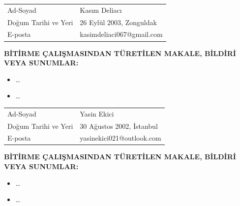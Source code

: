 \documentclass{btu-thesis}
\begin{document}
\BTUmainmatter





\printbibliography[heading=btureferences]

% 

\begin{BTUcv}
\begin{tabular}{@{}p{4.3cm}@{ : }p{9cm}@{}}
Ad-Soyad & Kasım Deliacı\\
Doğum Tarihi ve Yeri & 26 Eylül 2003, Zonguldak\\
E-posta & kasimdeliaci067@gmail.com\\
\end{tabular}

\vspace{1cm}
\textbf{BİTİRME ÇALIŞMASINDAN TÜRETİLEN MAKALE, BİLDİRİ VEYA SUNUMLAR:}

\begin{itemize}
\item \ldots
\item \ldots
\end{itemize}

\clearpage

\begin{tabular}{@{}p{4.3cm}@{ : }p{9cm}@{}}
Ad-Soyad & Yasin Ekici\\
Doğum Tarihi ve Yeri & 30 Ağustos 2002, İstanbul\\
E-posta & yasinekici021@outlook.com\\
\end{tabular}

\vspace{1cm}
\textbf{BİTİRME ÇALIŞMASINDAN TÜRETİLEN MAKALE, BİLDİRİ VEYA SUNUMLAR:}

\begin{itemize}
\item \ldots
\item \ldots
\end{itemize}
\end{BTUcv}
\end{document}

